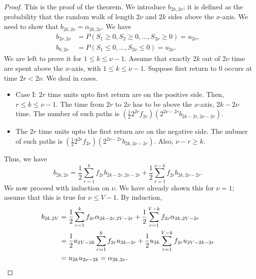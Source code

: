 \documentclass[15pt,a4paper]{book}
\theoremstyle{definition}
\begin{document}
\begin{proof}
    This is the proof of the theorem. We introduce $b_{2k,2\nu}$; it is defined as the probability that the random walk of length $2\nu$ and $2k$ sides above the $x$-axis. We need to show that $b_{2k,2\nu} = \alpha_{2k,2\nu}$. We have
    \begin{align}
        b_{2\nu,2\nu} &= P(S_{1} \geq 0, S_{2} \geq 0, \ldots, S_{2\nu} \geq 0) = u_{2\nu}, \\
        b_{0,2\nu} &= P(S_{1} \leq 0, \ldots, S_{2\nu} \leq 0) = u_{2\nu}.
    \end{align}
    We are left to prove it for $1 \leq k \leq \nu-1$. Assume that exactly $2k$ out of $2\nu$ time are spent above the $x$-axis, with $1 \leq k \leq \nu-1$. Suppose first return to 0 occurs at time $2r < 2\nu$. We deal in cases.
    \begin{itemize}
        \item Case I: $2r$ time units upto first return are on the positive side. Then, $r \leq k \leq \nu-1$. The time from $2r$ to $2\nu$ has to be above the $x$-axis, $2k-2\nu$ time. The number of such paths is $(\frac{1}{2}2^{2r}f_{2r}) (2^{2\nu-2r} b_{2k-2r,2\nu-2r})$.
        \item The $2r$ time units upto the first return are on the negative side. The nubmer of such paths is $(\frac{1}{2}2^{2r}f_{2r})(2^{2\nu-2r}b_{2k,2\nu-2r})$. Also, $\nu-r \geq k$.
    \end{itemize}
    Thus, we have
    \begin{equation}
        b_{2k,2\nu} = \frac{1}{2}\sum_{r=1}^{k} f_{2r} b_{2k-2r,2\nu-2r} + \frac{1}{2} \sum_{r=1}^{\nu-k} f_{2r} b_{2k,2\nu-2r}.
    \end{equation}
    We now proceed with induction on $\nu$. We have already shown this for $\nu = 1$; assume that this is true for $\nu \leq V - 1$. By induction,
    \begin{align}
        b_{2k,2V} &= \frac{1}{2}\sum_{r=1}^{k} f_{2r} \alpha_{2k-2r,2V-2r} + \frac{1}{2} \sum_{r=1}^{V - k} f_{2r} \alpha_{2k,2V-2r} \notag \\
        &= \frac{1}{2} u_{2V-2k} \sum_{r=1}^{k} f_{2r} u_{2k-2r} + \frac{1}{2} u_{2k} \sum_{r=1}^{V-k} f_{2r} u_{2V-2k-2r} \notag \\
        &= u_{2k}u_{2\nu-2k} = \alpha_{2k,2\nu}.
    \end{align}
\end{proof}
\end{document}
